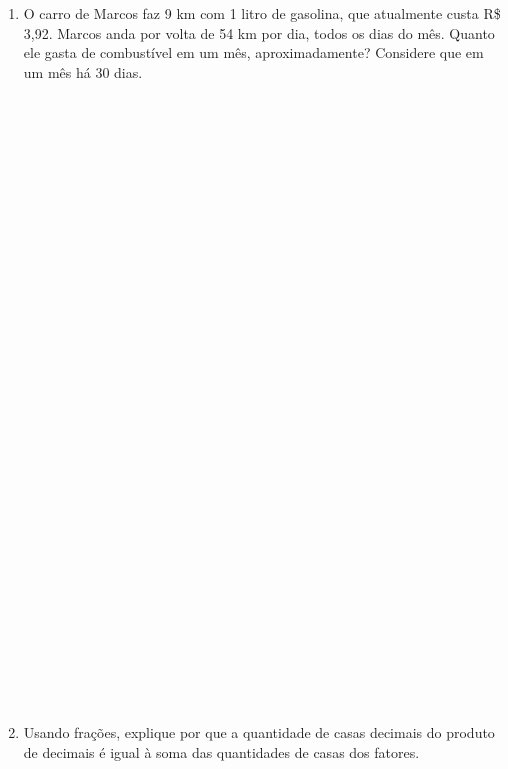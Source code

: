 \documentclass[a4paper,14pt]{article}
\begin{document}
\begin{multicols}{2}
\begin{enumerate}
    		\item O carro de Marcos faz 9 km com 1 litro de gasolina, que atualmente custa R\$ 3,92. Marcos anda por volta de 54 km por dia, todos os dias do mês. Quanto ele gasta de combustível em um mês, aproximadamente? Considere que em um mês há 30 dias. \\\\\\\\\\\\\\\\\\\\\\\\\\\\\\\\\\\\\\\\\\\\\\\\\\\\\\\\\\\\\\\\\\
    		\item Usando frações, explique por que a quantidade de casas decimais do produto de decimais é igual à soma das quantidades de casas dos fatores. \\\\\\\\\\\\\\\\\\\\\\\\
    	\end{enumerate}

\end{multicols}
\end{document}
